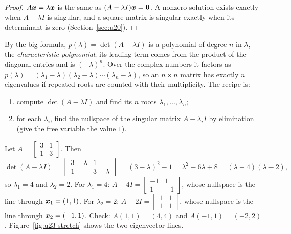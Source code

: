 \begin{proof}
$A\boldsymbol{x}=\lambda\boldsymbol{x}$ is the same as $(A-\lambda I)\boldsymbol{x}=\boldsymbol{0}$. A nonzero solution
exists exactly when $A-\lambda I$ is singular, and a square matrix is singular exactly when
its determinant is zero (Section~\ref{sec:u20}).
\end{proof}

By the big formula, $p(\lambda)=\det(A-\lambda I)$ is a polynomial of degree $n$ in
$\lambda$, the \emph{characteristic polynomial}; its leading term comes from the product of
the diagonal entries and is $(-\lambda)^{n}$. Over the complex numbers it factors as
$p(\lambda)=(\lambda_1-\lambda)(\lambda_2-\lambda)\cdots(\lambda_n-\lambda)$, so an
$n\times n$ matrix has exactly $n$ eigenvalues if repeated roots are counted with their
multiplicity. The recipe is:
\begin{enumerate}
  \item compute $\det(A-\lambda I)$ and find its $n$ roots $\lambda_1,\dots,\lambda_n$;
  \item for each $\lambda_i$, find the nullspace of the singular matrix $A-\lambda_i I$ by
  elimination (give the free variable the value $1$).
\end{enumerate}

\begin{example}\label{ex:u23-31}
Let $A=\begin{bmatrix} 3&1\\ 1&3\end{bmatrix}$. Then
\[
  \det(A-\lambda I)=\begin{vmatrix} 3-\lambda & 1\\ 1 & 3-\lambda\end{vmatrix}
  =(3-\lambda)^{2}-1=\lambda^{2}-6\lambda+8=(\lambda-4)(\lambda-2),
\]
so $\lambda_1=4$ and $\lambda_2=2$. For $\lambda_1=4$:
$A-4I=\left[\begin{smallmatrix} -1&1\\ 1&-1\end{smallmatrix}\right]$, whose nullspace is the
line through $\boldsymbol{x}_1=(1,1)$. For $\lambda_2=2$:
$A-2I=\left[\begin{smallmatrix} 1&1\\ 1&1\end{smallmatrix}\right]$, whose nullspace is the
line through $\boldsymbol{x}_2=(-1,1)$. Check: $A(1,1)=(4,4)$ and $A(-1,1)=(-2,2)$.
Figure~\ref{fig:u23-stretch} shows the two eigenvector lines.
\end{example}

